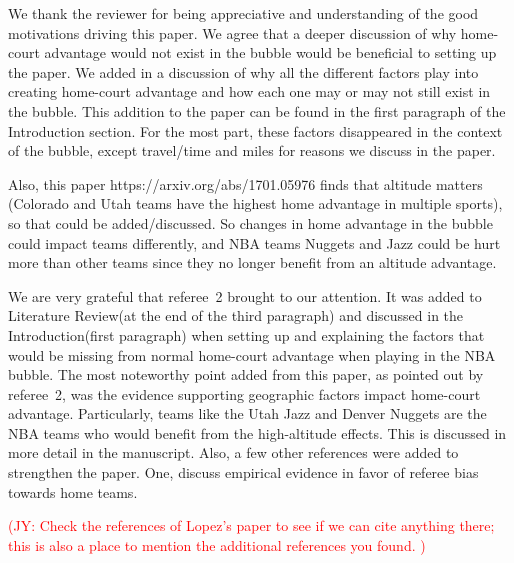 \documentclass[12pt]{article}
\newcommand{\jy}[1]{\textcolor{red}{(JY: #1)}}
\newenvironment{comment}%
{\begin{quoting}\noindent\small\it\ignorespaces%
  }{\end{quoting}}
\begin{document}
 We thank the reviewer for being appreciative and understanding of the 
 good motivations driving this paper. We agree that a deeper discussion 
 of why home-court advantage would not exist in the bubble would be beneficial 
 to setting up the paper. We added in a discussion of why all the different 
 factors play into creating home-court advantage and how each one may or may 
 not still exist in the bubble. This addition to the paper can be found in the first paragraph
 of the Introduction section. For the most part, these factors disappeared 
 in the context of the bubble, except travel/time and miles for reasons we
 discuss in the paper. 

\begin{comment}
Also, this paper https://arxiv.org/abs/1701.05976 finds that altitude matters
(Colorado and Utah teams have the highest home advantage in multiple sports),
so that could be added/discussed. So changes in home advantage in the bubble
could impact teams differently, and NBA teams Nuggets and Jazz could be hurt
more than other teams since they no longer benefit from an altitude advantage.
\end{comment}

 We are very grateful that referee~2 brought \citet{Lopez} to our attention. 
 It was added to Literature Review(at the end of the third paragraph) and
 discussed in the Introduction(first paragraph) when setting 
 up and explaining the factors that would be missing from normal home-court 
 advantage when playing in the NBA bubble. The most noteworthy point added 
 from this paper, as pointed out by referee~2, was the evidence supporting 
 geographic factors impact home-court advantage. Particularly, teams like 
 the Utah Jazz and Denver Nuggets are the NBA teams who would benefit from 
 the high-altitude effects. This is discussed in more detail in the manuscript.
  Also, a few other references were added to strengthen the paper.
  One, \cite{Price} discuss empirical evidence in favor of referee bias towards home teams.
  

 \jy{Check the references of Lopez's paper to see if we can cite
   anything there; this is also a place to mention the additional
   references you found. }
\end{document}
